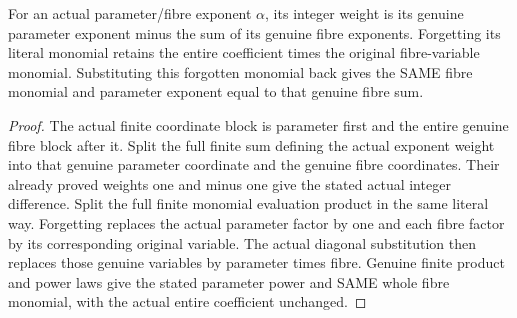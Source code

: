 \begin{lemma}
\label{hir:relative-normal-graph-weight-literal-monomial-reconstruction}
\leanok
For an actual parameter/fibre exponent $\alpha$, its integer weight is its genuine parameter exponent minus the sum of its genuine fibre exponents. Forgetting its literal monomial retains the entire coefficient times the original fibre-variable monomial. Substituting this forgotten monomial back gives the SAME fibre monomial and parameter exponent equal to that genuine fibre sum.
\end{lemma}
\begin{proof}
The actual finite coordinate block is parameter first and the entire genuine fibre block after it. Split the full finite sum defining the actual exponent weight into that genuine parameter coordinate and the genuine fibre coordinates. Their already proved weights one and minus one give the stated actual integer difference. Split the full finite monomial evaluation product in the same literal way. Forgetting replaces the actual parameter factor by one and each fibre factor by its corresponding original variable. The actual diagonal substitution then replaces those genuine variables by parameter times fibre. Genuine finite product and power laws give the stated parameter power and SAME whole fibre monomial, with the actual entire coefficient unchanged.
\end{proof}

